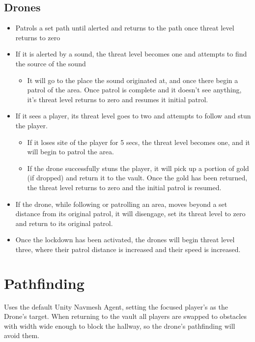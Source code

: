 \documentclass[10pt]{report}
\begin{document}
\subsection{Drones}

\begin{itemize}
    \item Patrols a set path until alerted and returns to the path once threat level returns to zero
    \item If it is alerted by a sound, the threat level becomes one and attempts to find the source of the sound
    \begin{itemize}
        \item It will go to the place the sound originated at, and once there begin a patrol of the area. Once patrol is complete and it doesn’t see anything, it’s threat level returns to zero and resumes it initial patrol.
    \end{itemize}
    \item If it sees a player, its threat level goes to two and attempts to follow and stun the player.
    \begin{itemize}
        \item If it loses site of the player for 5 secs, the threat level becomes one, and it will begin to patrol the area.
        \item If the drone successfully stuns the player, it will pick up a portion of gold (if dropped) and return it to the vault. Once the gold has been returned, the threat level returns to zero and the initial patrol is resumed.
    \end{itemize}
    \item If the drone, while following or patrolling an area, moves beyond a set distance from its original patrol, it will disengage, set its threat level to zero and return to its original patrol.
    \item Once the lockdown has been activated, the drones will begin threat level three, where their patrol distance is increased and their speed is increased.    
\end{itemize}

\section{Pathfinding}

Uses the default Unity Navmesh Agent, setting the focused player’s as the Drone’s target. When returning to the vault all players are swapped to obstacles with width wide enough to block the hallway, so the drone’s pathfinding will avoid them.
\end{document}
